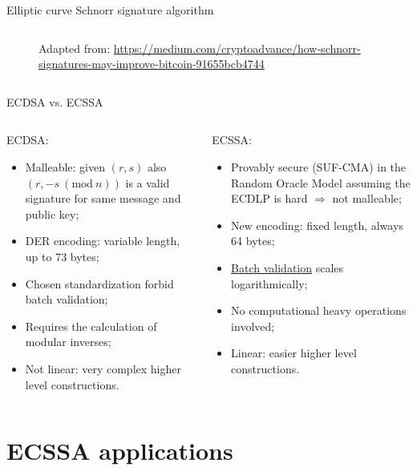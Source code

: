 \documentclass[slidescentered]{beamer}
\newcommand{\source}[1]{\caption*{\tiny Adapted from: {#1}} }
\begin{document}
\begin{frame}{Elliptic curve Schnorr signature algorithm}
\begin{columns}
\begin{column}{0.5\linewidth}
\begin{figure}
{						\source{\tiny \url{https://medium.com/cryptoadvance/how-schnorr-signatures-may-improve-bitcoin-91655bcb4744}}}
				\end{figure}
			\end{column}
		\end{columns}
	\end{frame}

	\begin{frame}{ECDSA vs. ECSSA}
		\begin{columns}
			\begin{column}{0.5\linewidth}
				ECDSA:
				\begin{itemize}
					\item<2 -> Malleable: given $(r, s)$ also $(r, -s \ (\text{mod} \ n))$ is a valid signature for same message and public key;
					\item<3 -> DER encoding: variable length, up to 73 bytes;
					\item<4 -> Chosen standardization forbid batch validation;
					\item<5 -> Requires the calculation of modular inverses;
					\item<6 -> Not linear: very complex higher level constructions.
				\end{itemize}
			\end{column}
			\begin{column}{0.5\linewidth}
				ECSSA:
				\begin{itemize}
					\item<2 -> Provably secure (SUF-CMA) in the Random Oracle Model assuming the ECDLP is hard $\Longrightarrow$ not malleable;
					\item<3 -> New encoding: fixed length, always 64 bytes;
					\item<4 -> \hyperlink{batch_validation}{Batch validation} scales logarithmically;
					\item<5 -> No computational heavy operations involved;
					\item<6 -> Linear: easier higher level constructions.
				\end{itemize}
			\end{column}
		\end{columns}
	\end{frame}
	
	\section{ECSSA applications}
	
\end{document}

